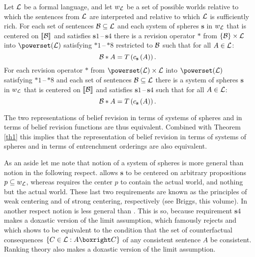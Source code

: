 \begin{theorem}\label{th2}
Let $\cal L$ be a formal language, and let $w_{\cal L}$ be a set of possible worlds relative to which the sentences from $\cal L$ are interpreted and relative to which $\cal L$ is sufficiently rich. For each set of sentences $\cal B\subseteq L$ and each system of spheres $\textbf{s}$ in $w_{\cal L}$ that is centered on $\llbracket\cal B\rrbracket$ and satisfies $\textbf{s}1$\,--\,$\textbf{s}4$ there is a revision operator $*$ from $\left\{\cal B\right\}\times\cal L$ into $\powerset\!\left(\cal L\right)$ satisfying $*1$\,--\,$*8$ restricted to $\cal B$ such that for all $A\in\cal L$:
$$\begin{cal}B\end{cal}*A=T\left(c_{\textbf{s}}\left(A\right)\right).$$
For each revision operator $*$ from $\powerset\!\left(\cal L\right)\times\cal L$ into $\powerset\!\left(\cal L\right)$ satisfying $*1$\,--\,$*8$ and each set of sentences $\cal B\subseteq L$ there is a system of spheres $\textbf{s}$ in $w_{\cal L}$ that is centered on $\llbracket\cal B\rrbracket$ and satisfies $\textbf{s}1$\,--\,$\textbf{s}4$ such that for all $A\in\cal L$:
$$\begin{cal}B\end{cal}*A=T\left(c_{\textbf{s}}\left(A\right)\right).$$
\end{theorem}
The two representations of belief revision in terms of systems of spheres and in terms of belief revision functions are thus equivalent. Combined with Theorem \ref{th1} this implies that the representation of belief revision in terms of systems of spheres and in terms of entrenchment orderings are also equivalent.%

As an aside let me note that  notion of a system of spheres is more general than  notion in the following respect. \citet{g88} allows $\textbf{s}$ to be centered on arbitrary propositions $p\subseteq w_{\cal L}$, whereas \citet[14f]{l73} requires the center $p$ to contain the actual world, and nothing but the actual world. These last two requirements are known as the principles of weak centering and of strong centering, respectively (see Briggs, this volume). In another respect  notion is less general than . This is so, because requirement $\textbf{s}4$ makes a doxastic version of the limit assumption, which \citet[19f]{l73} famously rejects and which \citet{h79} shows to be equivalent to the condition that the set of counterfactual consequences $\{C\in\begin{cal}L\end{cal}:A\boxright C\}$ of any consistent sentence $A$ be consistent. Ranking theory also makes a doxastic version of the limit assumption.

